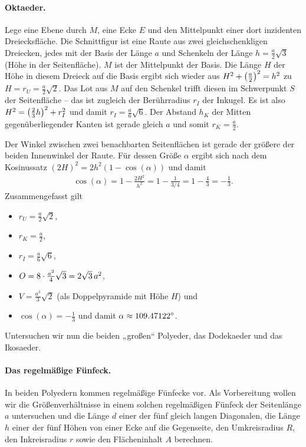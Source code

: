 \documentclass[11pt]{article}
\begin{document}
\paragraph{Oktaeder.}
Lege eine Ebene durch $M$, eine Ecke $E$ und den Mittelpunkt einer dort
inzidenten Dreiecksfläche. Die Schnittfigur ist eine Raute aus zwei
gleichschenkligen Dreiecken, jedes mit der Basis der Länge $a$ und Schenkeln
der Länge $h=\frac{a}{2}\sqrt{3}$ (Höhe in der Seitenfläche). $M$ ist der
Mittelpunkt der Basis. Die Länge $H$ der Höhe in diesem Dreieck auf die Basis
ergibt sich wieder aus $H^2+\left(\frac{a}{2}\right)^2=h^2$ zu
$H=r_U=\frac{a}{2}\sqrt{2}$. Das Lot aus $M$ auf den Schenkel trifft diesen im
Schwerpunkt $S$ der Seitenfläche -- das ist zugleich der Berührradius $r_I$
der Inkugel. Es ist also $H^2=\left(\frac23 h\right)^2+r_I^2$ und damit
$r_I=\frac{a}{6}\sqrt{6}$.  Der Abstand $h_K$ der Mitten gegenüberliegender
Kanten ist gerade gleich $a$ und somit $r_K=\frac{a}{2}$.

Der Winkel zwischen zwei benachbarten Seitenflächen ist gerade der größere der
beiden Innenwinkel der Raute.  Für dessen Größe $\alpha$ ergibt sich nach dem
Kosinussatz $(2H)^2=2h^2(1-\cos(\alpha))$ und damit
\begin{gather*}
  \cos(\alpha)=1-\frac{2H^2}{h^2}=1-\frac{1}{3/4}=1-\frac43=-\frac13.
\end{gather*}
Zusammengefasst gilt
\begin{itemize}
\item $r_U=\frac{a}{2}\sqrt{2}$, 
\item $r_K=\frac{a}{2}$,
\item $r_I=\frac{a}{6}\sqrt{6}$,
\item $O=8\cdot\frac{a^2}{4}\sqrt{3}=2\sqrt{3}\,a^2$,
\item $V=\frac{a^3}{3}\sqrt{2}$ (als Doppelpyramide mit Höhe $H$) und
\item $\cos(\alpha)=-\frac13$ und damit $\alpha\approx 109.47122^{\circ}$.
\end{itemize}

Untersuchen wir nun die beiden „großen“ Polyeder, das Dodekaeder und das
Ikosaeder. 

\paragraph{Das regelmäßige Fünfeck.}
In beiden Polyedern kommen regelmäßige Fünfecke vor. Als Vorbereitung wollen
wir die Größenverhältnisse in einem solchen regelmäßigen Fünfeck der
Seitenlänge $a$ untersuchen und die Länge $d$ einer der fünf gleich langen
Diagonalen, die Länge $h$ einer der fünf Höhen von einer Ecke auf die
Gegenseite, den Umkreisradius $R$, den Inkreisradius $r$ sowie den
Flächeninhalt $A$ berechnen.
\end{document}
